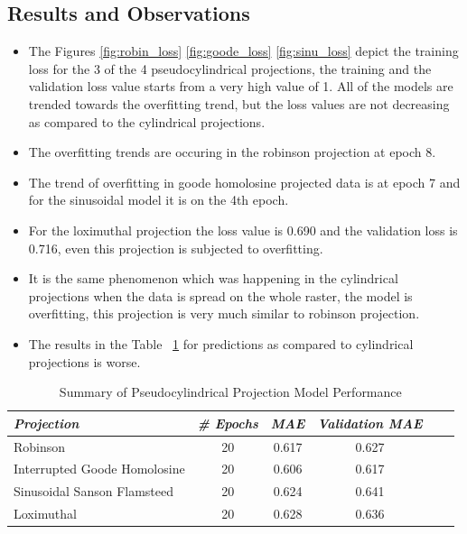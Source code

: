 \subsection{Results and Observations}
\begin{itemize}
    \item The Figures \ref{fig:robin_loss} \ref{fig:goode_loss} \ref{fig:sinu_loss} depict the training loss for the 3 of the 4 pseudocylindrical projections, the training and the validation loss value starts from a very high value of 1. All of the models are trended towards the overfitting trend,
          but the loss values are not decreasing as compared to the cylindrical projections.
    \item The overfitting trends are occuring in the robinson projection at epoch 8.
    \item The trend of overfitting in goode homolosine projected data is at epoch 7 and for the sinusoidal model it is on the 4th epoch.
    \item For the loximuthal projection the loss value is 0.690 and the validation loss is 0.716, even this projection is subjected to overfitting.
    \item It is the same phenomenon which was happening in the cylindrical projections when the data is spread on the whole raster, the model is overfitting, this projection is very much similar to robinson projection.
    \item The results in the Table ~\ref{pseudo_cylindrical_results_table} for predictions as compared to cylindrical projections is worse.
\end{itemize}
\begin{table}[ht]
    \centering
    \caption{Summary of Pseudocylindrical Projection Model Performance}
    \label{pseudo_cylindrical_results_table}
    \renewcommand{\arraystretch}{1.2} %
    \begin{tabular}{|l|c|c|c|c|c|}
        \hline
        \rowcolor[gray]{0.9}
        \textbf{\emph{Projection}}   & \textbf{\emph{\# Epochs}} & \textbf{\emph{MAE}} & \textbf{\emph{Validation MAE}} \\ \hline
        Robinson                     & 20                        & 0.617               & 0.627                          \\ \hline
        Interrupted Goode Homolosine & 20                        & 0.606               & 0.617                          \\ \hline
        Sinusoidal Sanson Flamsteed  & 20                        & 0.624               & 0.641                          \\ \hline
        Loximuthal                   & 20                        & 0.628               & 0.636                          \\ \hline
    \end{tabular}
\end{table}

